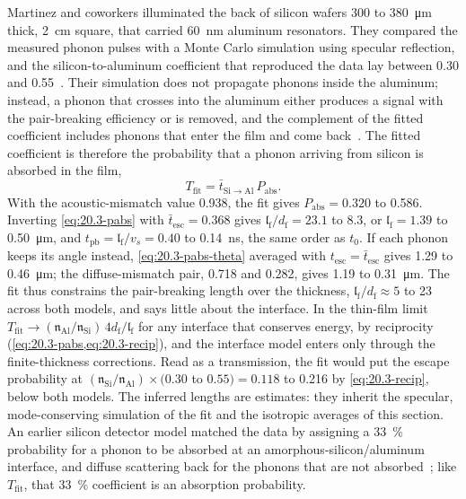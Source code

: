 Martinez and coworkers illuminated the back of silicon wafers 300 to \SI{380}{\micro m} thick, \SI{2}{cm} square, that carried \SI{60}{nm} aluminum resonators. They compared the measured phonon pulses with a Monte Carlo simulation using specular reflection, and the silicon-to-aluminum coefficient that reproduced the data lay between 0.30 and 0.55~\cite[Sect.~V]{martinez2019measurements}. Their simulation does not propagate phonons inside the aluminum; instead, a phonon that crosses into the aluminum either produces a signal with the pair-breaking efficiency or is removed, and the complement of the fitted coefficient includes phonons that enter the film and come back~\cite[Sect.~IV]{martinez2019measurements}. The fitted coefficient is therefore the probability that a phonon arriving from silicon is absorbed in the film,
\begin{equation}
  T_{\mathrm{fit}} = \bar t_{\mathrm{Si\to Al}}\,P_{\mathrm{abs}} .
  \label{eq:20.3-Tfit}
\end{equation}
With the acoustic-mismatch value 0.938, the fit gives $P_{\mathrm{abs}} = 0.320$ to 0.586. Inverting \cref{eq:20.3-pabs} with $\bar t_{\mathrm{esc}} = 0.368$ gives $\mathfrak{l}_{\mathrm{f}}/d_{\mathrm{f}} = 23.1$ to 8.3, or $\mathfrak{l}_{\mathrm{f}} = 1.39$ to \SI{0.50}{\micro m}, and $t_{\mathrm{pb}} = \mathfrak{l}_{\mathrm{f}}/v_s = 0.40$ to \SI{0.14}{ns}, the same order as $t_0$. If each phonon keeps its angle instead, \cref{eq:20.3-pabs-theta} averaged with $t_{\mathrm{esc}} = \bar t_{\mathrm{esc}}$ gives 1.29 to \SI{0.46}{\micro m}; the diffuse-mismatch pair, 0.718 and 0.282, gives 1.19 to \SI{0.31}{\micro m}. The fit thus constrains the pair-breaking length over the thickness, $\mathfrak{l}_{\mathrm{f}}/d_{\mathrm{f}} \approx 5$ to 23 across both models, and says little about the interface. In the thin-film limit $T_{\mathrm{fit}} \to (\mathfrak{n}_{\mathrm{Al}}/\mathfrak{n}_{\mathrm{Si}})\,4d_{\mathrm{f}}/\mathfrak{l}_{\mathrm{f}}$ for any interface that conserves energy, by reciprocity (\cref{eq:20.3-pabs,eq:20.3-recip}), and the interface model enters only through the finite-thickness corrections. Read as a transmission, the fit would put the escape probability at $(\mathfrak{n}_{\mathrm{Si}}/\mathfrak{n}_{\mathrm{Al}})\times(0.30$ to $0.55) = 0.118$ to 0.216 by \cref{eq:20.3-recip}, below both models. The inferred lengths are estimates: they inherit the specular, mode-conserving simulation of the fit and the isotropic averages of this section. An earlier silicon detector model matched the data by assigning a \SI{33}{\percent} probability for a phonon to be absorbed at an amorphous-silicon/aluminum interface, and diffuse scattering back for the phonons that are not absorbed~\cite[Sect.~III\,G]{leman2012invited}; like $T_{\mathrm{fit}}$, that \SI{33}{\percent} coefficient is an absorption probability.

